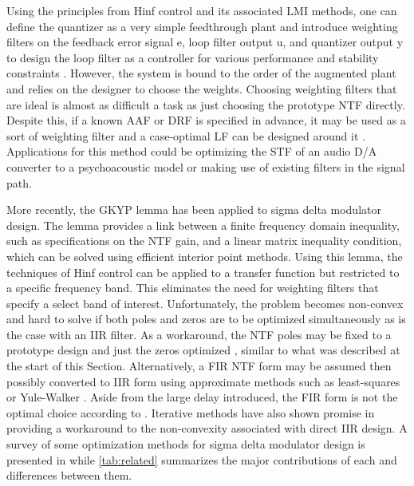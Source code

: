 Using the principles from \gls{Hinf} control and its associated \gls{LMI} methods, one can define the quantizer as a very simple feedthrough plant and introduce weighting filters on the feedback error signal \gls{e}, loop filter output \gls{u}, and quantizer output \gls{y} to design the loop filter as a controller for various performance and stability constraints \cite{Oberoi2004}. However, the system is bound to the order of the augmented plant and relies on the designer to choose the weights. Choosing weighting filters that are ideal is almost as difficult a task as just choosing the prototype \gls{NTF} directly. Despite this, if a known \gls{AAF} or \gls{DRF} is specified in advance, it may be used as a sort of weighting filter and a case-optimal \gls{LF} can be designed around it \cite{Ohno2017b}. Applications for this method could be optimizing the \gls{STF} of an audio \gls{D/A} converter to a psychoacoustic model or making use of existing filters in the signal path.

More recently, the \gls{GKYP} lemma has been applied to sigma delta modulator design. The lemma provides a link between a finite frequency domain inequality, such as specifications on the \gls{NTF} gain, and a linear matrix inequality condition, which can be solved using efficient interior point methods. Using this lemma, the techniques of \gls{Hinf} control can be applied to a transfer function but restricted to a specific frequency band. This eliminates the need for weighting filters that specify a select band of interest. Unfortunately, the problem becomes non-convex and hard to solve if both poles and zeros are to be optimized simultaneously as is the case with an \gls{IIR} filter. As a workaround, the \gls{NTF} poles may be fixed to a prototype design and just the zeros optimized \cite{Osqui2007}, similar to what was described at the start of this Section. Alternatively, a \gls{FIR} \gls{NTF} form may be assumed \cite{Nagahara2012, Tariq2016} then possibly converted to \gls{IIR} form using approximate methods such as least-squares or Yule-Walker \cite{Tariq2017}. Aside from the large delay introduced, the \gls{FIR} form is not the optimal choice according to \cite{Derpich2008}. Iterative methods have also shown promise in providing a workaround to the non-convexity associated with direct \gls{IIR} design. A survey of some optimization methods for sigma delta modulator design is presented in \cite{Callegari2015} while \autoref{tab:related} summarizes the major contributions of each and differences between them.


